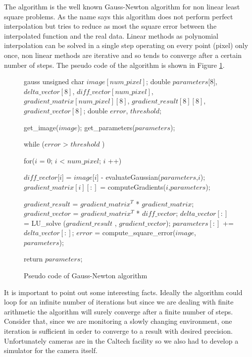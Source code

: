 The algorithm is the well known Gauss-Newton algorithm for non linear least square problems.
As the name says this algorithm does not perform perfect interpolation but tries to reduce as most the square error between the interpolated function and the real data.
Linear methods as polynomial interpolation can be solved in a single step operating on every point (pixel) only once, non linear methods are iterative and so tends to converge after a certain number of steps.
The pseudo code of the algorithm is shown in Figure \ref{code:gauss}.

\begin{figure}[h]
\begin{center} 
\begin{minipage}[c]{.85\textwidth} 
\centering 
\begin{pseudo}{}{gauss}
unsigned char $image[num\_pixel]$;
double $parameters$[8], $delta\_vector[8]$, $diff\_vector[num\_pixel]$, $gradient\_matrix[num\_pixel][8]$, $gradient\_result[8][8]$, $gradient\_vector[8]$;
double $error$, $threshold$;

get_image($image$);
get_parameters($parameters$);

while ($error$ > $threshold$ ) {
    for($i$ = 0; $i$ < $num\_pixel$; $i$ ++){
	
          $diff\_vector$[$i$] = $image$[$i$] - evaluateGaussian($parameters$,$i$); 
          $gradient\_matrix[i][:]$ = computeGradients($i$,$parameters$);
	      
    }
    $gradient\_result$ = $gradient\_matrix^T$ * $gradient\_matrix$;
    $gradient\_vector$ = $gradient\_matrix^T$ * $diff\_vector$;
    $delta\_vector[:]$ = LU_solve ($gradient\_result$ , $gradient\_vector$);
    $parameters[:]$ += $delta\_vector[:]$;
    $error$ = compute_square_error($image$, $parameters$);
}
return $parameters$;

\end{pseudo}
\end{minipage} 
\end{center} 
\label{code:gauss}
\caption{Pseudo code of Gauss-Newton algorithm}
\end{figure}

It is important to point out some interesting facts.
Ideally the algorithm could loop for an infinite number of iterations but since we are dealing with finite arithmetic the algorithm will surely converge after a finite number of steps.
Consider that, since we are monitoring a slowly changing environment, one iteration is sufficient in order to converge to a result with desired precision. 
Unfortunately cameras are in the Caltech facility so we also had to develop a simulator for the camera itself.

